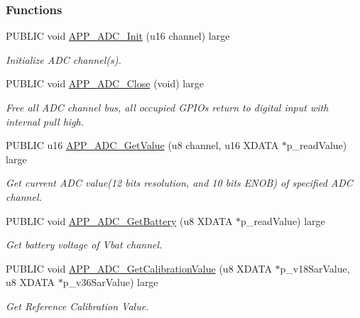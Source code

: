 \subsubsection*{Functions}
\begin{DoxyCompactItemize}
\item 
P\+U\+B\+L\+IC void \hyperlink{group___a_d_c_ga4949f13c3c7385d680d592fc0ad2ec43}{A\+P\+P\+\_\+\+A\+D\+C\+\_\+\+Init} (u16 channel) large
\begin{DoxyCompactList}\small\item\em Initialize A\+DC channel(s). \end{DoxyCompactList}\item 
P\+U\+B\+L\+IC void \hyperlink{group___a_d_c_ga836d5c302b3543589dadb9b6503fa6ed}{A\+P\+P\+\_\+\+A\+D\+C\+\_\+\+Close} (void) large\hypertarget{group___a_d_c_ga836d5c302b3543589dadb9b6503fa6ed}{}\label{group___a_d_c_ga836d5c302b3543589dadb9b6503fa6ed}

\begin{DoxyCompactList}\small\item\em Free all A\+DC channel bus, all occupied G\+P\+I\+Os return to digital input with internal pull high. \end{DoxyCompactList}\item 
P\+U\+B\+L\+IC u16 \hyperlink{group___a_d_c_ga45d7a98dad9d4a719ac3a795679740d0}{A\+P\+P\+\_\+\+A\+D\+C\+\_\+\+Get\+Value} (u8 channel, u16 X\+D\+A\+TA $\ast$p\+\_\+read\+Value) large
\begin{DoxyCompactList}\small\item\em Get current A\+DC value(12 bits resolution, and 10 bits E\+N\+O\+B) of specified A\+DC channel. \end{DoxyCompactList}\item 
P\+U\+B\+L\+IC void \hyperlink{group___a_d_c_ga05987c2a1b9a75cb72bdce39cd53f156}{A\+P\+P\+\_\+\+A\+D\+C\+\_\+\+Get\+Battery} (u8 X\+D\+A\+TA $\ast$p\+\_\+read\+Value) large
\begin{DoxyCompactList}\small\item\em Get battery voltage of Vbat channel. \end{DoxyCompactList}\item 
P\+U\+B\+L\+IC void \hyperlink{group___a_d_c_gad1b95f19eda6b7fb908ca297b288931f}{A\+P\+P\+\_\+\+A\+D\+C\+\_\+\+Get\+Calibration\+Value} (u8 X\+D\+A\+TA $\ast$p\+\_\+v18\+Sar\+Value, u8 X\+D\+A\+TA $\ast$p\+\_\+v36\+Sar\+Value) large
\begin{DoxyCompactList}\small\item\em Get Reference Calibration Value. \end{DoxyCompactList}\end{DoxyCompactItemize}



